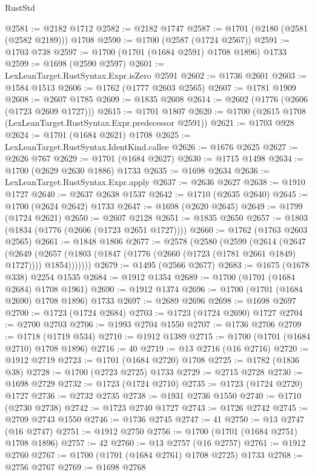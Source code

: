 \begin{lexlean}{RustStd}
\begin{coremodule}
@2581 := @2182 @1712
@2582 := @2182 @1747
@2587 := @1701 (@2180 (@2581 (@2582 @2189))) @1708
@2590 := @1700 (@2587 (@1724 @2567))
@2591 := @1703 @738
@2597 := @1700 (@1701 (@1684 @2591) @1708 @1896) @1733
@2599 := @1698 (@2590 @2597)
@2601 := LexLeanTarget.RustSyntax.Expr.isZero @2591
@2602 := @1736 @2601
@2603 := @1584 @1513
@2606 := @1762 (@1777 @2603 @2565)
@2607 := @1781 @1909
@2608 := @2607 @1785
@2609 := @1835 @2608
@2614 := @2602 (@1776 (@2606 (@1723 @2609 @1727)))
@2615 := @1701 @1807
@2620 := @1700 (@2615 @1708 (LexLeanTarget.RustSyntax.Expr.predecessor @2591))
@2621 := @1703 @928
@2624 := @1701 (@1684 @2621) @1708
@2625 := LexLeanTarget.RustSyntax.IdentKind.callee
@2626 := @1676 @2625
@2627 := @2626 @767
@2629 := @1701 (@1684 @2627)
@2630 := @1715 @1498
@2634 := @1700 (@2629 @2630 @1886) @1733
@2635 := @1698 @2634
@2636 := LexLeanTarget.RustSyntax.Expr.apply
@2637 := @2636 @2627
@2638 := @1910 @1727
@2640 := @2637 @2638 @1537
@2642 := @1710 (@2635 @2640)
@2645 := @1700 (@2624 @2642) @1733
@2647 := @1698 (@2620 @2645)
@2649 := @1799 (@1724 @2621)
@2650 := @2607 @2128
@2651 := @1835 @2650
@2657 := @1803 (@1834 (@1776 (@2606 (@1723 @2651 @1727))))
@2660 := @1762 (@1763 @2603 @2565)
@2661 := @1848 @1806
@2677 := @2578
    (@2580
      (@2599
        (@2614
          (@2647
            (@2649
              (@2657 (@1803 (@1847 (@1776 (@2660 (@1723 (@1781 @2661 @1849) @1727)))) @1854)))))))
@2679 := @1495 (@2566 @2677)
@2683 := @1675 (@1678 @338) @2254 @1535
@2684 := @1912 @1354
@2689 := @1700 (@1701 (@1684 @2684) @1708 @1961)
@2690 := @1912 @1374
@2696 := @1700 (@1701 (@1684 @2690) @1708 @1896) @1733
@2697 := @2689 @2696
@2698 := @1698 @2697
@2700 := @1723 (@1724 @2684)
@2703 := @1723 (@1724 @2690) @1727
@2704 := @2700 @2703
@2706 := @1993 @2704 @1550
@2707 := @1736 @2706
@2709 := @1718 (@1719 @534)
@2710 := @1912 @1389
@2715 := @1700 (@1701 (@1684 @2710) @1708 @1896)
@2716 := 40
@2719 := @13 @2716 (@16 @2716)
@2720 := @1912 @2719
@2723 := @1701 (@1684 @2720) @1708
@2725 := @1782 (@1836 @38)
@2728 := @1700 (@2723 @2725) @1733
@2729 := @2715 @2728
@2730 := @1698 @2729
@2732 := @1723 (@1724 @2710)
@2735 := @1723 (@1724 @2720) @1727
@2736 := @2732 @2735
@2738 := @1931 @2736 @1550
@2740 := @1710 (@2730 @2738)
@2742 := @1723 @2740 @1727
@2743 := @1726 @2742
@2745 := @2709 @2743 @1550
@2746 := @1736 @2745
@2747 := 41
@2750 := @13 @2747 (@16 @2747)
@2751 := @1912 @2750
@2756 := @1700 (@1701 (@1684 @2751) @1708 @1896)
@2757 := 42
@2760 := @13 @2757 (@16 @2757)
@2761 := @1912 @2760
@2767 := @1700 (@1701 (@1684 @2761) @1708 @2725) @1733
@2768 := @2756 @2767
@2769 := @1698 @2768

\end{coremodule}
\end{lexlean}

